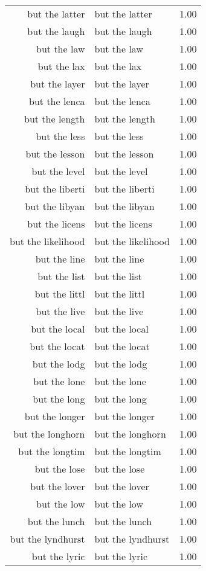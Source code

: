 \begin{table}[ht]
\begin{tabular}{rlr}
  but the latter & but the latter & 1.00 \\ 
  but the laugh & but the laugh & 1.00 \\ 
  but the law & but the law & 1.00 \\ 
  but the lax & but the lax & 1.00 \\ 
  but the layer & but the layer & 1.00 \\ 
  but the lenca & but the lenca & 1.00 \\ 
  but the length & but the length & 1.00 \\ 
  but the less & but the less & 1.00 \\ 
  but the lesson & but the lesson & 1.00 \\ 
  but the level & but the level & 1.00 \\ 
  but the liberti & but the liberti & 1.00 \\ 
  but the libyan & but the libyan & 1.00 \\ 
  but the licens & but the licens & 1.00 \\ 
  but the likelihood & but the likelihood & 1.00 \\ 
  but the line & but the line & 1.00 \\ 
  but the list & but the list & 1.00 \\ 
  but the littl & but the littl & 1.00 \\ 
  but the live & but the live & 1.00 \\ 
  but the local & but the local & 1.00 \\ 
  but the locat & but the locat & 1.00 \\ 
  but the lodg & but the lodg & 1.00 \\ 
  but the lone & but the lone & 1.00 \\ 
  but the long & but the long & 1.00 \\ 
  but the longer & but the longer & 1.00 \\ 
  but the longhorn & but the longhorn & 1.00 \\ 
  but the longtim & but the longtim & 1.00 \\ 
  but the lose & but the lose & 1.00 \\ 
  but the lover & but the lover & 1.00 \\ 
  but the low & but the low & 1.00 \\ 
  but the lunch & but the lunch & 1.00 \\ 
  but the lyndhurst & but the lyndhurst & 1.00 \\ 
  but the lyric & but the lyric & 1.00 \\ 

\end{tabular}
\end{table}
